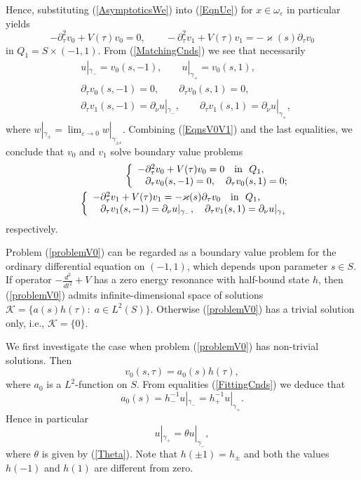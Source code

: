 \documentclass[graybox]{svmult}
\renewcommand{\kappa}{\varkappa}
\newcommand{\eps}{\varepsilon}
\newcommand{\eqref}[1]{(\ref{#1})}
\newcommand{\pte}{\partial_\tau}
\begin{document}
Hence, substituting \eqref{AsymptoticsWe} into \eqref{EqnUe} for $x\in \omega_\eps$ in particular yields
\begin{equation}\label{EqnsV0V1}
-\pte^2 v_0+V(\tau)v_0=0, \qquad -\pte^2 v_1+V(\tau)v_1=-\kappa(s)\pte v_0
\end{equation}
in $Q_1=S\times(-1,1)$.
From \eqref{MatchingCnds} we see that necessarily
\begin{eqnarray}\label{FittingCnds}
  &u|_{\gamma_-}=v_0(s,-1),\qquad u|_{\gamma_+}=v_0(s,1), \\ \nonumber
  &\partial_\tau v_0(s,- 1)=0, \qquad \partial_\tau v_0(s, 1)=0, \\\nonumber
&\partial_\tau v_1(s, -1)=\partial_\nu u|_{\gamma_-}, \qquad
\partial_\tau v_1(s, 1)=\partial_\nu u|_{\gamma_+},
\end{eqnarray}
where $w|_{\gamma_\pm}=\lim_{\eps\to 0}w|_{\gamma_{\pm\eps}}$.
Combining \eqref{EqnsV0V1} and the last equalities, we conclude that $v_0$ and $v_1$ solve boundary value problems
\begin{eqnarray}\label{problemV0}
&&\left\{
  \begin{array}{ll}
    -\pte^2 v_0+V(\tau)v_0=0 \quad \hbox{in \ } Q_1, \\
    \phantom{-}\partial_\tau v_0(s,- 1)=0, \quad \partial_\tau v_0(s, 1)=0;
  \end{array}
\right.\\\label{problemV1}
&&\left\{
  \begin{array}{ll}
    -\pte^2 v_1+V(\tau)v_1=-\kappa(s)\pte v_0\quad \hbox{in \ } Q_1, \\
    \phantom{-}\partial_\tau v_1(s, -1)=\partial_\nu u|_{\gamma_-}, \quad
\partial_\tau v_1(s, 1)=\partial_\nu u|_{\gamma_+}
  \end{array}
\right.
\end{eqnarray}
respectively.

Problem \eqref{problemV0} can be regarded as a boundary value problem for the ordinary differential equation on $(-1,1)$, which depends upon parameter $s\in S$. If operator $-\frac{d^2}{dt^2}+V$ has a zero energy resonance with half-bound state $h$, then \eqref{problemV0}  admits infinite-dimensional space of solutions $\mathcal{K}=\{a(s)h(\tau)\colon \;a\in L^2(S)\}$. Otherwise  \eqref{problemV0} has a trivial solution only, i.e., $\mathcal{K}=\{0\}$.

We first investigate the case when problem \eqref{problemV0} has non-trivial solutions. Then
$$
v_0(s,\tau)=a_0(s)h(\tau),
$$
where $a_0$ is a $L^2$-function on $S$. From equalities \eqref{FittingCnds} we deduce that
$$
   a_0(s)=h_-^{-1}u|_{\gamma_-}=h_+^{-1}u|_{\gamma_+}.
$$
Hence in particular
\begin{equation}\label{RCond0}
     u|_{\gamma_+}=\theta u|_{\gamma_-},
\end{equation}
where $\theta$ is given by \eqref{Theta}. Note that $h(\pm 1)=h_\pm$ and both the values $h(-1)$ and $h(1)$ are different from zero.
\end{document}
